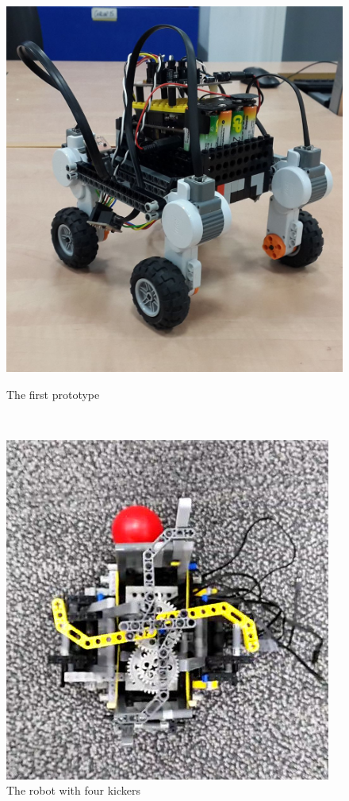 \documentclass[12pt]{article}
\begin{document}
\begin{figure}[h]
	\centering
	\begin{minipage}[b]{.48\textwidth}
        \centering
		\includegraphics[scale=.18]{robot0.jpg}
		\caption{The first prototype}
		\label{fig:robot0}
	\end{minipage}
	~
	\begin{minipage}[b]{.48\textwidth}
        \centering
		\includegraphics[scale=.65]{robot3.jpg}
		\caption{The robot with four kickers}
		\label{fig:robot3}
	\end{minipage}
\end{figure}
\end{document}
